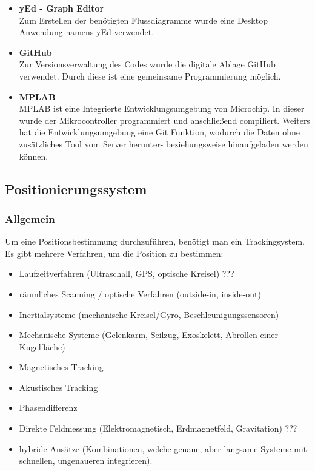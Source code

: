     \begin{itemize}
      \item \textbf{yEd - Graph Editor}\\ 
      Zum Erstellen der benötigten Flussdiagramme wurde eine Desktop Anwendung namens yEd verwendet. \cite{Tool_yed}
      \item \textbf{GitHub}\\ 
      Zur Versionsverwaltung des Codes wurde die digitale Ablage GitHub verwendet. Durch diese ist eine gemeinsame Programmierung möglich.\cite{Tool_github}
      \item \textbf{MPLAB}\\ 
      MPLAB ist eine Integrierte Entwicklungsumgebung von Microchip. In dieser wurde der Mikrocontroller programmiert und anschließend compiliert. Weiters hat die Entwicklungsumgebung eine Git Funktion, wodurch die Daten ohne zusätzliches Tool vom Server herunter- beziehungsweise hinaufgeladen werden können. \cite{Tool_mplab}
    \end{itemize}



  \subsection{Positionierungssystem}

    \subsubsection{Allgemein}
    Um eine Positionsbestimmung durchzuführen, benötigt man ein Trackingsystem. 
    Es gibt mehrere Verfahren, um die Position zu bestimmen: \cite{PositionAllg}
    \begin{itemize}
    \item Laufzeitverfahren (Ultraschall, GPS, optische Kreisel) ???
    \item räumliches Scanning / optische Verfahren (outside-in, inside-out)
    \item Inertialsysteme (mechanische Kreisel/Gyro, Beschleunigungssensoren)
    \item Mechanische Systeme (Gelenkarm, Seilzug, Exoskelett, Abrollen einer Kugelfläche)
    \item Magnetisches Tracking
    \item Akustisches Tracking
    \item Phasendifferenz
    \item Direkte Feldmessung (Elektromagnetisch, Erdmagnetfeld, Gravitation) ???
    \item hybride Ansätze (Kombinationen, welche genaue, aber langsame Systeme mit schnellen, ungenaueren integrieren).
    \end{itemize}   

